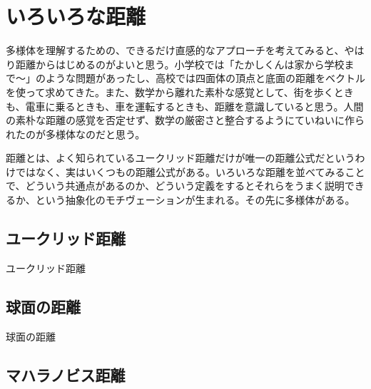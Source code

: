 \maketitle

\newpage

\tableofcontents

\newpage


\section{ いろいろな距離 }

多様体を理解するための、できるだけ直感的なアプローチを考えてみると、やはり距離からはじめるのがよいと思う。小学校では「たかしくんは家から学校まで〜」のような問題があったし、高校では四面体の頂点と底面の距離をベクトルを使って求めてきた。また、数学から離れた素朴な感覚として、街を歩くときも、電車に乗るときも、車を運転するときも、距離を意識していると思う。人間の素朴な距離の感覚を否定せず、数学の厳密さと整合するようにていねいに作られたのが多様体なのだと思う。

距離とは、よく知られているユークリッド距離だけが唯一の距離公式だというわけではなく、実はいくつもの距離公式がある。いろいろな距離を並べてみることで、どういう共通点があるのか、どういう定義をするとそれらをうまく説明できるか、という抽象化のモチヴェーションが生まれる。その先に多様体がある。

\newpage


\subsection{ ユークリッド距離 }

ユークリッド距離

\newpage


\subsection{ 球面の距離 }

球面の距離

\newpage


\subsection{ マハラノビス距離 }

